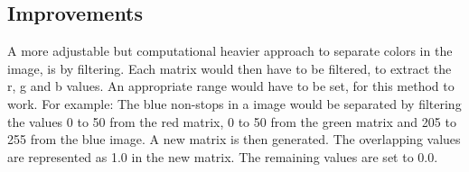 \subsection{Improvements}
A more adjustable but computational heavier approach to separate colors in the image, is by filtering. Each matrix would then have to be filtered, to extract the r, g and b values. An appropriate range would have to be set, for this method to work. For example: The blue non-stops in a image would be separated by filtering the values 0 to 50 from the red matrix, 0 to 50 from the green matrix and 205 to 255 from the blue image. A new matrix is then generated. The overlapping values are represented as 1.0 in the new matrix. The remaining values are set to 0.0. \\

